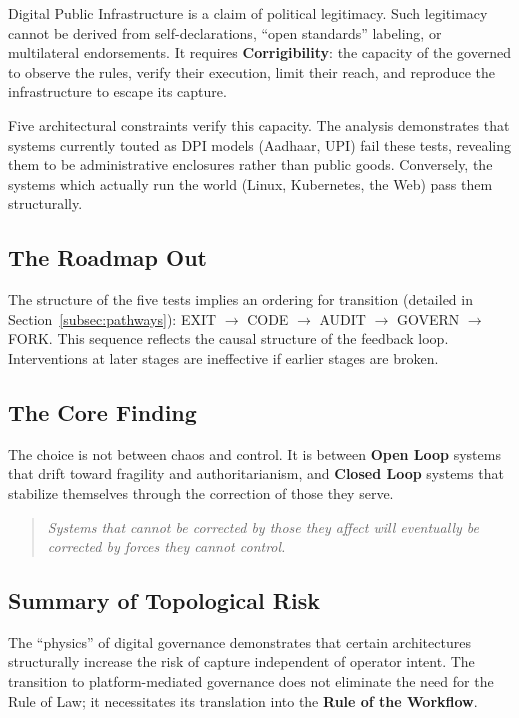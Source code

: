 \documentclass{article}
\begin{document}
Digital Public Infrastructure is a claim of political legitimacy. Such legitimacy cannot be derived from self-declarations, ``open standards'' labeling, or multilateral endorsements. It requires \textbf{Corrigibility}: the capacity of the governed to observe the rules, verify their execution, limit their reach, and reproduce the infrastructure to escape its capture.

Five architectural constraints verify this capacity. The analysis demonstrates that systems currently touted as DPI models (Aadhaar, UPI) fail these tests, revealing them to be administrative enclosures rather than public goods. Conversely, the systems which actually run the world (Linux, Kubernetes, the Web) pass them structurally.

\subsection{The Roadmap Out}

The structure of the five tests implies an ordering for transition (detailed in Section~\ref{subsec:pathways}): EXIT $\to$ CODE $\to$ AUDIT $\to$ GOVERN $\to$ FORK. This sequence reflects the causal structure of the feedback loop. Interventions at later stages are ineffective if earlier stages are broken.

\subsection{The Core Finding}

The choice is not between chaos and control. It is between \textbf{Open Loop} systems that drift toward fragility and authoritarianism, and \textbf{Closed Loop} systems that stabilize themselves through the correction of those they serve.

\begin{quote}
\textit{Systems that cannot be corrected by those they affect will eventually be corrected by forces they cannot control.}
\end{quote}

\subsection{Summary of Topological Risk}

The ``physics'' of digital governance demonstrates that certain architectures structurally increase the risk of capture independent of operator intent. The transition to platform-mediated governance does not eliminate the need for the Rule of Law; it necessitates its translation into the \textbf{Rule of the Workflow}.
\end{document}
